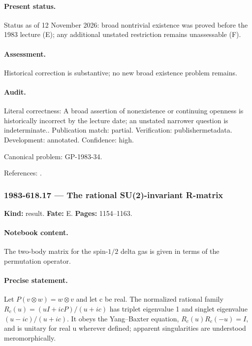 \paragraph{Present status.} Status as of 12 November 2026: broad nontrivial existence was proved before the 1983 lecture (E); any additional unstated restriction remains unassessable (F).

\paragraph{Assessment.} Historical correction is substantive; no new broad existence problem remains.

\paragraph{Audit.} Literal correctness: A broad assertion of nonexistence or continuing openness is historically incorrect by the lecture date; an unstated narrower question is indeterminate.. Publication match: partial. Verification: publishermetadata. Development: annotated. Confidence: high.

\noindent Canonical problem: GP-1983-34.\par

\noindent References: \citep{zamolodchikov1981tetrahedron,baxter1983tetrahedron,bazhanovsergeev2006tetrahedron}.\par

\subsubsection{1983-618.17 --- The rational SU(2)-invariant R-matrix}

\label{item:1983-618.17}

\noindent\textbf{Kind:} result. \textbf{Fate:} E. \textbf{Pages:} 1154--1163.\par

\paragraph{Notebook content.} The two-body matrix for the spin-$1/2$ delta gas is given in terms of the permutation operator.

\paragraph{Precise statement.} Let $P(v\otimes w)=w\otimes v$ and let c be real. The normalized rational family $R_c(u)=(uI+icP)/(u+ic)$ has triplet eigenvalue 1 and singlet eigenvalue $(u-ic)/(u+ic)$. It obeys the Yang--Baxter equation, $R_c(u)R_c(-u)=I$, and is unitary for real u wherever defined; apparent singularities are understood meromorphically.

